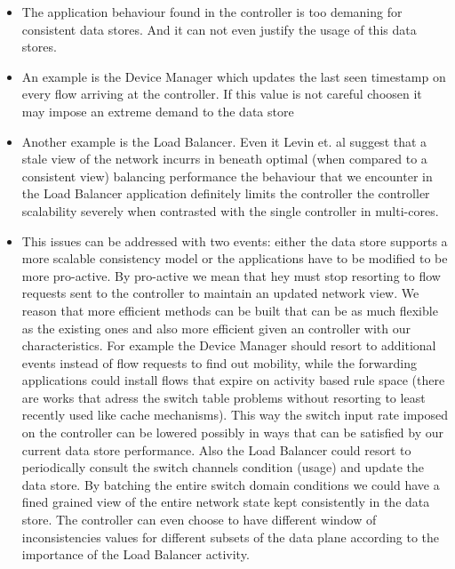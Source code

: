\begin{itemize}
\item The application behaviour found in the controller is too demaning for consistent data stores. And it can not even justify the usage of this data stores. 
\item An example is the Device Manager which updates the last seen timestamp on every flow arriving at the controller. If this value is not careful choosen it may impose an extreme demand to the data store
\item Another example is the Load Balancer. Even it Levin et. al suggest that a stale view of the network incurrs in beneath optimal (when compared to a consistent view) balancing performance the behaviour that we encounter in the Load Balancer application definitely limits the controller the controller scalability severely when contrasted with the single controller in multi-cores. 
\item This issues can be addressed with two events: either the data store supports a more scalable consistency model or the applications have to be modified to be more pro-active. By pro-active we mean that hey must stop resorting to flow requests sent to the controller to maintain an updated network view. We reason that more efficient methods can be built that can be as much flexible as the existing ones and also more efficient given an controller with our characteristics. For example the Device Manager should resort to additional  events instead of flow requests to find out mobility, while the forwarding applications could install flows that expire on activity based rule space (there are works that adress the switch table problems without resorting to least recently used like cache mechanisms). This way the switch input rate imposed on the controller can be lowered possibly in ways that can be satisfied by our current data store performance. Also the Load Balancer could resort to periodically consult the switch channels condition (usage) and update the data store. By batching the entire switch domain conditions we could have a fined grained  view of the entire network state kept consistently in the data store. The controller can even choose to have different window of inconsistencies values for different subsets of the data plane according to the importance of the Load Balancer activity. 
\end{itemize}



